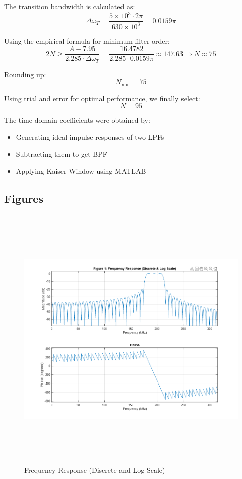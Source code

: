 \documentclass[12pt]{article}
\begin{document}
The transition bandwidth is calculated as:
\[
\Delta \omega_T = \frac{5 \times 10^3 \cdot 2\pi}{630 \times 10^3} = 0.0159\pi
\]

Using the empirical formula for minimum filter order:
\[
2N \geq \frac{A - 7.95}{2.285 \cdot \Delta \omega_T} = \frac{16.4782}{2.285 \cdot 0.0159\pi} \approx 147.63 \Rightarrow N \approx 75
\]

Rounding up:
\[
N_{\text{min}} = 75
\]

Using trial and error for optimal performance, we finally select:
\[
N = 95
\]

The time domain coefficients were obtained by:
\begin{itemize}
    \item Generating ideal impulse responses of two LPFs
    \item Subtracting them to get BPF
    \item Applying Kaiser Window using MATLAB
\end{itemize}

\subsection{Figures}

\begin{figure}[H]
    \centering
    \includegraphics[height=13cm]{g21.png}
    \caption{Frequency Response (Discrete and Log Scale)}
    \label{fig:freq_response_g2}
\end{figure}
\end{document}
